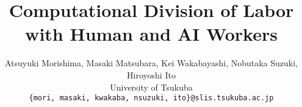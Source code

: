 \documentclass[11pt]{article}
\begin{document}
\title{%
Computational Division of Labor with Human and AI Workers}


\author{
	Atsuyuki Morishima,
	Masaki Matsubara,
	Kei Wakabayashi,
	Nobutaka Suzuki,
	Hiroyoshi Ito \\
	University of Tsukuba\\
	\texttt{{\footnotesize \{mori, masaki, kwakaba, nsuzuki, ito\}@slis.tsukuba.ac.jp}}
}

\maketitle

\newcommand{\scream}[1]{\textbf{***#1***}}




%
%
%

%
%
%
\end{document}
